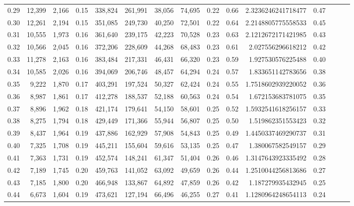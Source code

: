 \begin{tabular}{rrrrrrrrrrrrrrr}
0.29 &  12,399 &  2,166 &  0.15 &  338,824 &  261,991 &   38,056 &   74,695 &  0.22 &  0.66 &    2.3236246241718477 &      0.47 \\
0.30 &  12,261 &  2,194 &  0.15 &  351,085 &  249,730 &   40,250 &   72,501 &  0.22 &  0.64 &    2.2148805775558533 &      0.45 \\
0.31 &  10,555 &  1,973 &  0.16 &  361,640 &  239,175 &   42,223 &   70,528 &  0.23 &  0.63 &    2.1212672171421985 &      0.43 \\
0.32 &  10,566 &  2,045 &  0.16 &  372,206 &  228,609 &   44,268 &   68,483 &  0.23 &  0.61 &     2.027556296618212 &      0.42 \\
0.33 &  11,278 &  2,163 &  0.16 &  383,484 &  217,331 &   46,431 &   66,320 &  0.23 &  0.59 &     1.927530576225488 &      0.40 \\
0.34 &  10,585 &  2,026 &  0.16 &  394,069 &  206,746 &   48,457 &   64,294 &  0.24 &  0.57 &     1.833651142783656 &      0.38 \\
0.35 &   9,222 &  1,870 &  0.17 &  403,291 &  197,524 &   50,327 &   62,424 &  0.24 &  0.55 &    1.7518602939220052 &      0.36 \\
0.36 &   8,987 &  1,861 &  0.17 &  412,278 &  188,537 &   52,188 &   60,563 &  0.24 &  0.54 &     1.672153683781075 &      0.35 \\
0.37 &   8,896 &  1,962 &  0.18 &  421,174 &  179,641 &   54,150 &   58,601 &  0.25 &  0.52 &    1.5932541618256157 &      0.33 \\
0.38 &   8,275 &  1,794 &  0.18 &  429,449 &  171,366 &   55,944 &   56,807 &  0.25 &  0.50 &     1.519862351553423 &      0.32 \\
0.39 &   8,437 &  1,964 &  0.19 &  437,886 &  162,929 &   57,908 &   54,843 &  0.25 &  0.49 &    1.4450337469290737 &      0.31 \\
0.40 &   7,325 &  1,708 &  0.19 &  445,211 &  155,604 &   59,616 &   53,135 &  0.25 &  0.47 &     1.380067582549157 &      0.29 \\
0.41 &   7,363 &  1,731 &  0.19 &  452,574 &  148,241 &   61,347 &   51,404 &  0.26 &  0.46 &    1.3147643923335492 &      0.28 \\
0.42 &   7,189 &  1,745 &  0.20 &  459,763 &  141,052 &   63,092 &   49,659 &  0.26 &  0.44 &    1.2510044256813686 &      0.27 \\
0.43 &   7,185 &  1,800 &  0.20 &  466,948 &  133,867 &   64,892 &   47,859 &  0.26 &  0.42 &     1.187279935432945 &      0.25 \\
0.44 &   6,673 &  1,604 &  0.19 &  473,621 &  127,194 &   66,496 &   46,255 &  0.27 &  0.41 &    1.1280964248654113 &      0.24 \\

\end{tabular}

